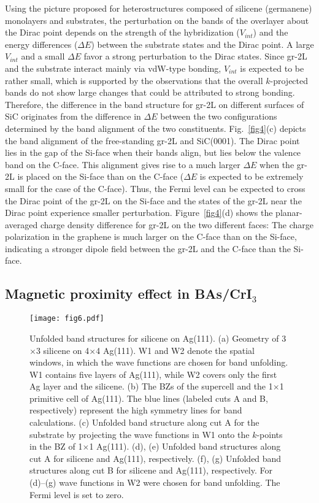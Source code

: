 \documentclass[aps,prb,showpacs,twocolumn,reprint,superscriptaddress]{revtex4-1}
\begin{document}
Using the picture proposed for heterostructures composed of silicene (germanene) monolayers and substrates,
the perturbation on the bands of the overlayer about the Dirac point depends on the strength of the hybridization ($V_{int}$) and 
the energy differences ($\Delta E$) between the substrate states and the Dirac point.\cite{chen_design} 
A large $V_{int}$ and a small $\Delta E$ favor a strong perturbation to the Dirac states.
Since gr-2L and the substrate interact mainly via vdW-type bonding, $V_{int}$ is expected to be rather small,
which is supported by the observations that the overall $k$-projected bands do not show large changes that
could be attributed to strong bonding. 
Therefore, the difference in the band structure for gr-2L on different surfaces of SiC 
originates from the difference in $\Delta E$ between the two configurations
determined by the band alignment of the two constituents. 
Fig.~\ref{fig4}(c) depicts the band alignment of the free-standing gr-2L and SiC(0001). 
The Dirac point lies in the gap of the Si-face when their bands align, but
lies below the valence band on the C-face.
This alignment gives rise to a much larger $\Delta E$ when the gr-2L is placed on the Si-face than on the C-face 
($\Delta E$ is expected to be extremely small for the case of the C-face).
Thus, the Fermi level can be expected to cross the Dirac point of the gr-2L on the Si-face and
the states of the gr-2L near the Dirac point experience smaller perturbation.
Figure~\ref{fig4}(d) shows the planar-averaged charge density difference for gr-2L on the two different faces:
The charge polarization in the graphene is much larger on the C-face than on the Si-face,
indicating a stronger dipole field between the gr-2L and the C-face than the Si-face.


\subsection{Magnetic proximity effect in BAs/CrI$_3$}

\begin{figure*}
  \texttt{[image: fig6.pdf]}
  \caption{Unfolded band structures for silicene on Ag(111). 
  (a) Geometry of 3$\times$3 silicene on 4$\times$4 Ag(111). 
  W1 and W2 denote the spatial windows, in which the wave functions are chosen for band unfolding.
  W1 contains five layers of Ag(111), while W2 covers only the first Ag layer and the silicene.
  (b) The BZs of the supercell and the 1$\times$1 primitive cell of Ag(111). 
  The blue lines (labeled cuts A and B, respectively) represent the high symmetry lines for band calculations.
  (c) Unfolded band structure along cut A for the substrate by projecting the wave functions in W1 onto the $k$-points
  in the BZ of 1$\times$1 Ag(111).
  (d), (e) Unfolded band structures along cut A for silicene and Ag(111), respectively.
  (f), (g) Unfolded band structures along cut B for silicene and Ag(111), respectively.
  For (d)--(g) wave functions in W2 were chosen for band unfolding.
  The Fermi level is set to zero. 
  }
 \label{fig6}
\end{figure*}
\end{document}
